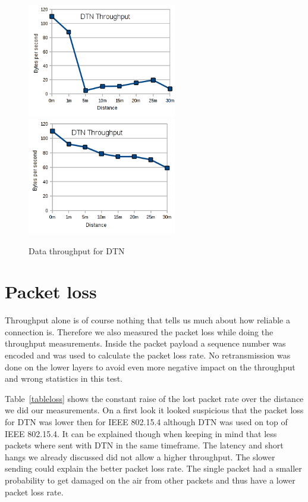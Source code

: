 \begin{figure}
  \begin{center}
    \includegraphics[width=6.5cm]{images/throughput_dtn}
    \includegraphics[width=6.5cm]{images/throughput_dtn2}
    \caption{Data throughput for DTN}
    \label{fig:throughput_dtn}
  \end{center}
\end{figure}

\section{Packet loss}
Throughput alone is of course nothing that tells us much about how reliable a
connection is. Therefore we also measured the packet loss while doing the
throughput measurements. Inside the packet payload a sequence number was encoded
and was used to calculate the packet loss rate. No retransmission
was done on the lower layers to avoid even more negative impact on the
throughput and wrong statistics in this test.

Table~\ref{tableloss} shows the constant raise of the lost packet rate over the
distance we did our measurements. On a first look it looked suspicious that the
packet loss for DTN was lower then for IEEE 802.15.4 although DTN was used on top
of IEEE 802.15.4. It can be explained though when keeping in mind that less
packets where sent with DTN in the same timeframe. The latency and short hangs
we already discussed did not allow a higher throughput. The slower sending could
explain the better packet loss rate. The single packet had a smaller probability
to get damaged on the air from other packets and thus have a lower packet loss
rate.

